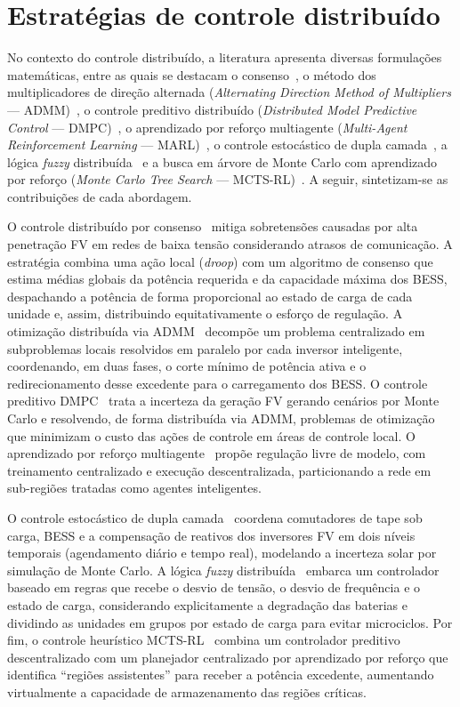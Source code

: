 \section{Estratégias de controle distribuído}
\label{sec:estrategias}

No contexto do controle distribuído, a literatura apresenta diversas formulações matemáticas, entre as 
quais se destacam o consenso~\cite{xing2022}, o método dos multiplicadores de direção alternada 
(\emph{Alternating Direction Method of Multipliers} --- ADMM)~\cite{far2023}, o controle preditivo 
distribuído (\emph{Distributed Model Predictive Control} --- DMPC)~\cite{ma2024}, o aprendizado por 
reforço multiagente (\emph{Multi-Agent Reinforcement Learning} --- MARL)~\cite{cao2021}, o controle 
estocástico de dupla camada~\cite{emarati2021}, a lógica \emph{fuzzy} distribuída~\cite{fuzzy2022} e a 
busca em árvore de Monte Carlo com aprendizado por reforço (\emph{Monte Carlo Tree Search} --- 
MCTS-RL)~\cite{alsaffar2020}. A seguir, sintetizam-se as contribuições de cada abordagem.

O controle distribuído por consenso~\cite{xing2022} mitiga sobretensões causadas por alta penetração FV 
em redes de baixa tensão considerando atrasos de comunicação. A estratégia combina uma ação local 
(\emph{droop}) com um algoritmo de consenso que estima médias globais da potência requerida e da 
capacidade máxima dos BESS, despachando a potência de forma proporcional ao estado de carga de cada 
unidade e, assim, distribuindo equitativamente o esforço de regulação. A otimização distribuída via 
ADMM~\cite{far2023} decompõe um problema centralizado em subproblemas locais resolvidos em paralelo por 
cada inversor inteligente, coordenando, em duas fases, o corte mínimo de potência ativa e o 
redirecionamento desse excedente para o carregamento dos BESS. O controle preditivo DMPC~\cite{ma2024} 
trata a incerteza da geração FV gerando cenários por Monte Carlo e resolvendo, de forma distribuída via 
ADMM, problemas de otimização que minimizam o custo das ações de controle em áreas de controle local. O 
aprendizado por reforço multiagente~\cite{cao2021} propõe regulação livre de modelo, com treinamento 
centralizado e execução descentralizada, particionando a rede em sub-regiões tratadas como agentes 
inteligentes.

O controle estocástico de dupla camada~\cite{emarati2021} coordena comutadores de tape sob carga, BESS e 
a compensação de reativos dos inversores FV em dois níveis temporais (agendamento diário e tempo real), 
modelando a incerteza solar por simulação de Monte Carlo. A lógica \emph{fuzzy} 
distribuída~\cite{fuzzy2022} embarca um controlador baseado em regras que recebe o desvio de tensão, o 
desvio de frequência e o estado de carga, considerando explicitamente a degradação das baterias e 
dividindo as unidades em grupos por estado de carga para evitar microciclos. Por fim, o controle 
heurístico MCTS-RL~\cite{alsaffar2020} combina um controlador preditivo descentralizado com um 
planejador centralizado por aprendizado por reforço que identifica ``regiões assistentes'' para 
receber a potência excedente, aumentando virtualmente a capacidade de armazenamento das regiões 
críticas.

